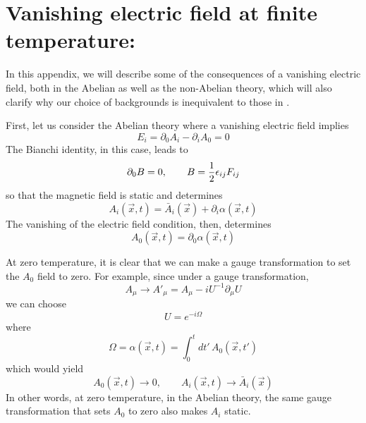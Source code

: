 \documentclass[a4paper,12pt]{article}
\begin{document}
\section{Vanishing electric field at finite temperature:}

In this appendix, we will describe some of the consequences of a
vanishing electric field, both in the Abelian as well as the
non-Abelian theory, which will also clarify why our choice of
backgrounds is inequivalent to those in \cite{fosco:1997vu}.

First, let us consider the Abelian theory where a vanishing electric
field implies
\begin{equation}
E_{i} = \partial_{0}A_{i} - \partial_{i}A_{0} = 0
\end{equation}
The Bianchi identity, in this case, leads to
\begin{equation}
\partial_{0} B = 0,\qquad B = {1\over 2} \epsilon_{ij}F_{ij}
\end{equation}
so that the magnetic field is static and determines
\begin{equation}
A_{i} (\vec{x},t) = \bar{A}_{i}(\vec{x}) + \partial_{i}\alpha
(\vec{x},t)
\end{equation}
The vanishing of the electric field condition, then, determines
\begin{equation}
A_{0}(\vec{x},t) = \partial_{0} \alpha(\vec{x},t)
\end{equation}

At zero temperature, it is clear that we can make a gauge
transformation to set the $A_{0}$ field to zero. For example, since
under a gauge transformation,
\begin{equation}
A_{\mu} \rightarrow A'_{\mu} = A_{\mu} - i U^{-1}\partial_{\mu} U
\end{equation}
we can choose
\begin{equation}
U = e^{-i\Omega}
\end{equation}
where
\begin{equation}
\Omega = \alpha (\vec{x},t) = \int_{0}^{t} dt'\,A_{0}(\vec{x},t')
\end{equation}
which would yield
\begin{equation}
A_{0}(\vec{x},t) \rightarrow 0,\qquad A_{i}(\vec{x},t) \rightarrow
\bar{A}_{i}(\vec{x}) 
\end{equation}
In other words, at zero temperature, in the Abelian theory, the same
gauge transformation that sets $A_{0}$ to zero also makes $A_{i}$
static.
\end{document}
